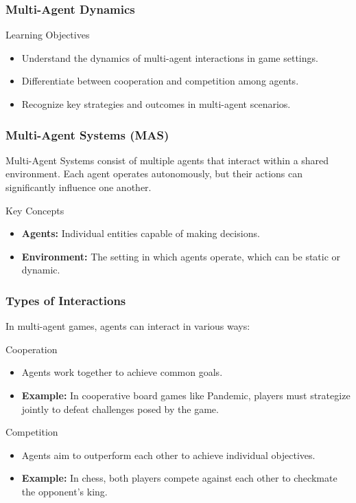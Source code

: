 \documentclass[aspectratio=169]{beamer}
\begin{document}
\begin{frame}[fragile]
    \frametitle{Multi-Agent Dynamics}
    \begin{block}{Learning Objectives}
        \begin{itemize}
            \item Understand the dynamics of multi-agent interactions in game settings.
            \item Differentiate between cooperation and competition among agents.
            \item Recognize key strategies and outcomes in multi-agent scenarios.
        \end{itemize}
    \end{block}
\end{frame}

\begin{frame}[fragile]
    \frametitle{Multi-Agent Systems (MAS)}
    Multi-Agent Systems consist of multiple agents that interact within a shared environment. Each agent operates autonomously, but their actions can significantly influence one another.
    
    \begin{block}{Key Concepts}
        \begin{itemize}
            \item \textbf{Agents:} Individual entities capable of making decisions.
            \item \textbf{Environment:} The setting in which agents operate, which can be static or dynamic.
        \end{itemize}
    \end{block}
\end{frame}

\begin{frame}[fragile]
    \frametitle{Types of Interactions}
    In multi-agent games, agents can interact in various ways:

    \begin{block}{Cooperation}
        \begin{itemize}
            \item Agents work together to achieve common goals.
            \item \textbf{Example:} In cooperative board games like Pandemic, players must strategize jointly to defeat challenges posed by the game.
        \end{itemize}
    \end{block}

    \begin{block}{Competition}
        \begin{itemize}
            \item Agents aim to outperform each other to achieve individual objectives.
            \item \textbf{Example:} In chess, both players compete against each other to checkmate the opponent's king.
        \end{itemize}
    \end{block}
\end{frame}
\end{document}
